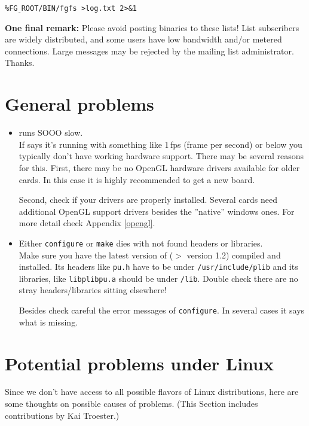 \texttt{\%FG$\underline{~~}$ROOT/BIN/fgfs >log.txt 2>\&1}
\medskip

\textbf{One final remark:} Please avoid posting binaries to these lists! List subscribers are widely distributed, and some users have low bandwidth and/or metered connections. Large messages may be rejected by the mailing list administrator. Thanks.

\section{General problems}
\begin{itemize}

\item{\FlightGear{} runs SOOO slow.}\\
 If \FlightGear{} says it's running with something like 1\,fps
 (frame per second) or below you typically don't have working hardware
  support. There may be several reasons for this. First,
 there may be no OpenGL hardware drivers available for older
 cards. In this case it is highly recommended to get a new board.

 Second, check if your drivers are properly installed. Several
 cards need additional OpenGL support drivers besides the
 ''native'' windows ones. For more detail check Appendix
 \ref{opengl}.

\item{Either \texttt{configure} or \texttt{make} dies with not found \PLIB{} headers or
 libraries.}\\
  Make sure you have the latest version of \PLIB{} ($>$ version 1.2) compiled and installed.
  Its headers like \texttt{pu.h} have to be under \texttt{/usr/include/plib} and its libraries, like \texttt{libplibpu.a} should be under \texttt{/lib}. Double check there are no stray \PLIB{} headers/libraries sitting elsewhere!

  Besides check careful the error messages of \texttt{configure}. In several cases it
  says what is missing.
 \end{itemize}

\section{Potential problems under Linux}
Since we don't have access to all possible flavors of Linux distributions, here are some
thoughts on possible causes of problems. (This Section includes contributions by Kai
Troester.)

